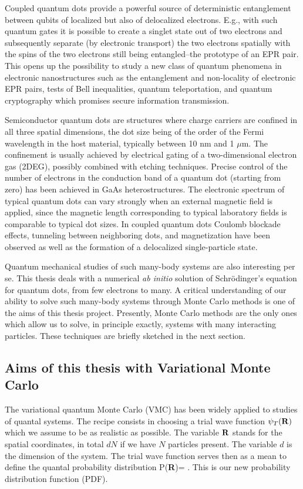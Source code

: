 Coupled quantum dots provide a powerful source of 
deterministic entanglement between qubits of localized 
but also of delocalized electrons. E.g., with such quantum gates it is
possible to create a singlet state out of two electrons 
and subsequently separate (by electronic transport) 
the two electrons spatially with the spins of the two electrons still being
entangled--the prototype of an EPR pair. 
This opens up the possibility to study a new class 
of quantum phenomena in electronic nanostructures 
such as the entanglement and
non-locality of electronic EPR pairs, tests of Bell inequalities, 
quantum teleportation, and quantum cryptography 
which promises secure information transmission. 


Semiconductor quantum dots are structures where
charge carriers are confined in all three spatial dimensions, 
the dot size being of the order of the Fermi wavelength 
in the host material, typically between  10 nm and  1 $\mu$m.
The confinement is usually achieved by electrical gating of a 
two-dimensional electron gas (2DEG), 
possibly combined with etching techniques. Precise control of the
number of electrons in the conduction band of a quantum dot 
(starting from zero) has been achieved in GaAs heterostructures. 
The electronic spectrum of typical quantum dots
can vary strongly when an external magnetic field is applied, 
since the magnetic length corresponding to typical 
laboratory fields  is comparable to typical dot sizes.
In coupled quantum dots Coulomb blockade effects, 
tunneling between neighboring dots, and magnetization 
have been observed as well as the formation of a
delocalized single-particle state. 


Quantum mechanical studies of such many-body systems are also
interesting per se. 
This thesis deals with a numerical {\em ab initio}  solution of  
Schr\"odinger's equation for quantum dots, from few electrons to many.
A critical understanding of our ability 
to solve such many-body systems through Monte Carlo methods is one 
of the aims
of this thesis project. Presently, Monte Carlo methods are
the only ones which allow us to solve, in principle exactly, 
systems with many interacting particles. These techniques are briefly sketched 
in the next section.


\subsection*{Aims of this thesis with Variational Monte Carlo}
The variational quantum Monte Carlo (VMC) has been widely applied 
to studies of quantal systems. 
The recipe consists in choosing 
a trial wave function
$\psi_T({\bf R})$ which we assume to be as realistic as possible. 
The variable ${\bf R}$ stands for the spatial coordinates, in total 
$dN$ if we have $N$ particles present. The variable $d$ is the dimension
of the system. 
The trial wave function serves then as
a mean to define the quantal probability distribution 
\be
   P({\bf R})= .
\ee
This is our new probability distribution function  (PDF). 

